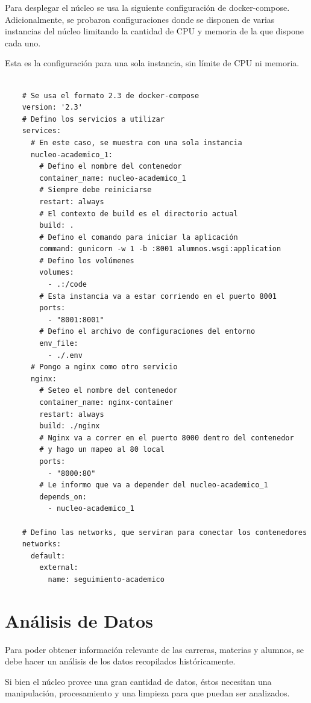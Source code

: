 Para desplegar el núcleo se usa la siguiente configuración de docker-compose. Adicionalmente, se probaron configuraciones donde se disponen de varias instancias del núcleo limitando la cantidad de CPU y memoria de la que dispone cada uno. 

Esta es la configuración para una sola instancia, sin límite de CPU ni memoria.


\begin{verbatim}
    
    # Se usa el formato 2.3 de docker-compose
    version: '2.3'
    # Defino los servicios a utilizar
    services:
      # En este caso, se muestra con una sola instancia
      nucleo-academico_1:
        # Defino el nombre del contenedor
        container_name: nucleo-academico_1
        # Siempre debe reiniciarse
        restart: always
        # El contexto de build es el directorio actual
        build: .
        # Defino el comando para iniciar la aplicación
        command: gunicorn -w 1 -b :8001 alumnos.wsgi:application
        # Defino los volúmenes
        volumes:
          - .:/code
        # Esta instancia va a estar corriendo en el puerto 8001
        ports:
          - "8001:8001"
        # Defino el archivo de configuraciones del entorno
        env_file:
          - ./.env
      # Pongo a nginx como otro servicio
      nginx:
        # Seteo el nombre del contenedor
        container_name: nginx-container
        restart: always
        build: ./nginx
        # Nginx va a correr en el puerto 8000 dentro del contenedor 
        # y hago un mapeo al 80 local
        ports:
          - "8000:80"
        # Le informo que va a depender del nucleo-academico_1
        depends_on:
          - nucleo-academico_1
    
    # Defino las networks, que serviran para conectar los contenedores
    networks:
      default:
        external:
          name: seguimiento-academico
  \end{verbatim}

\section[Análisis de Datos]{Análisis de Datos}

Para poder obtener información relevante de las carreras, materias y alumnos, se debe hacer un análisis de los datos recopilados históricamente.

Si bien el núcleo provee una gran cantidad de datos, éstos necesitan una manipulación, procesamiento y una limpieza para que puedan ser analizados.

